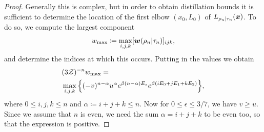 \documentclass[pra,
aps,
twocolumn,
superscriptaddress,
groupedaddress,
nofootinbib,
reprint
]{revtex4-1}
\begin{document}
\begin{proof}
Generally this is complex, but in order to obtain distillation bounds it is sufficient to determine the location of the first elbow $(x_0, L_0)$ of $L_{\rho_n|\tau_n}(\boldsymbol{x})$. To do so, we compute the largest component 
\begin{equation}
	w_{\rm max} \coloneqq \max_{i,j,k} [\boldsymbol{w}(\rho_n | \tau_n)]_{ijk},
\end{equation}
and determine the indices at which this occurs.
Putting in the values we obtain
\begin{align}
	&(3\mathcal{Z})^{-n}w_{\rm max} = \nonumber\\
	&\max\limits_{i,j,k}\Big\{ (-v)^{n-\alpha} u^{\alpha} e^{\beta (n-\alpha)E_s} e^{\beta ( i E_0 + j E_1 + k E_2 )} \Big\}, \label{eq:max_slope}
\end{align}
where $0 \leq i,j,k \leq n$ and $\alpha \coloneqq i+j+k \leq n$.
Now for $0 \leq \epsilon \leq 3/7$, we have $v \geq u$. Since we assume that $n$ is even, we need the sum $\alpha = i+j+k$ to be even too, so that the expression is positive. 


\end{proof}
\end{document}
